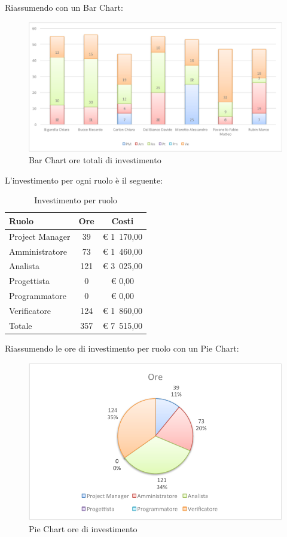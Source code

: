 				Riassumendo con un Bar Chart:
				\begin{figure}[H]\centering
					\includegraphics[width=\textwidth]{PianoDiProgetto/Pics/ChartOreInvest.pdf}
					\caption{Bar Chart ore totali di investimento}
				\end{figure}
				L'investimento per ogni ruolo è il seguente:
				\begin{table}[H]
					\begin{center}
						\begin{tabular}{| l | c | c |}
							\hline
							Ruolo 			& Ore 		& Costi  \\ \hline
							
							Project Manager	& 39 		& \euro{} 1~170,00 	\\
							Amministratore 		& 73 	& \euro{} 1~460,00 	\\
							Analista	 		& 121 	& \euro{} 3~025,00 	\\
							Progettista 		& 0		& \euro{} 0,00 	\\
							Programmatore		& 0		& \euro{} 0,00	\\
							Verificatore		& 124 	& \euro{} 1~860,00 	\\ \hline \hline
							
							Totale	 			& 357 	& \euro{} 7~515,00 	\\ \hline
						\end{tabular}
					\end{center}
					\caption{Investimento per ruolo}
				\end{table}
				Riassumendo le ore di investimento per ruolo con un Pie Chart:
				\begin{figure}[H]\centering
					\includegraphics[width=\textwidth]{PianoDiProgetto/Pics/ChartTotOreInvest.pdf}
					\caption{Pie Chart ore di investimento}
				\end{figure}
